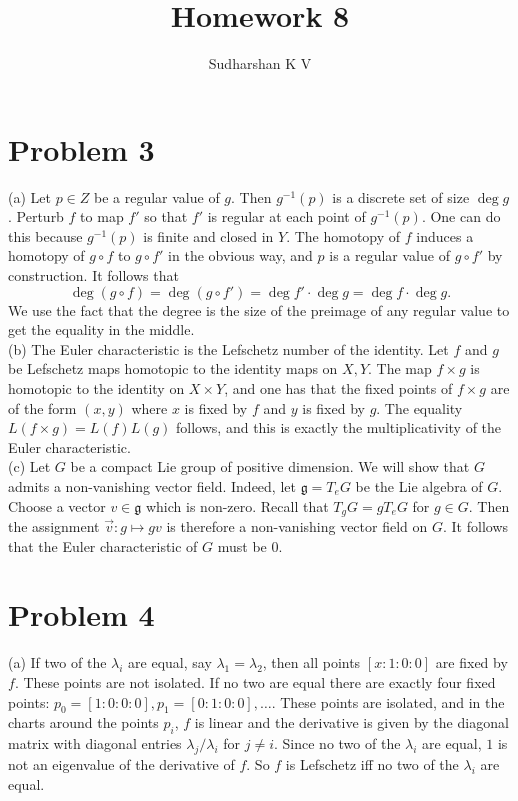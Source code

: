 \documentclass{amsart}
\title{Homework 8}
\author{Sudharshan K V}
\numberwithin{equation}{section}
\theoremstyle{plain}
\theoremstyle{definition}
\theoremstyle{remark}
\newcommand{\g}{\mathfrak{g}}
\renewcommand{\_}[2]{\underbrace{#1}_{#2}}
\renewcommand{\^}[2]{\overbrace{#1}_{#2}}
\begin{document}
\maketitle

\section*{Problem 3}

(a) Let $p\in Z$ be a regular value of $g$. Then $g^{-1}(p)$ is a discrete set of size $\deg g$. Perturb $f$ to map $f'$ so that $f'$ is regular at each point of $g^{-1}(p)$. One can do this because $g^{-1}(p)$ is finite and closed in $Y$. The homotopy of $f$ induces a homotopy of $g\circ f$ to $g \circ f'$ in the obvious way, and $p$ is a regular value of $g \circ f'$ by construction. It follows that \[\deg (g\circ f) = \deg (g\circ f') = \deg f' \cdot \deg g = \deg f \cdot \deg g.\] We use the fact that the degree is the size of the preimage of any regular value to get the equality in the middle.\\

(b) The Euler characteristic is the Lefschetz number of the identity. Let $f$ and $g$ be Lefschetz maps homotopic to the identity maps on $X,Y$. The map $f\times g$ is homotopic to the identity on $X\times Y$, and one has that the fixed points of $f\times g$ are of the form $(x,y)$ where $x$ is fixed by $f$ and $y$ is fixed by $g$. The equality $L(f\times g) = L(f)L(g)$ follows, and this is exactly the multiplicativity of the Euler characteristic.\\

(c) Let $G$ be a compact Lie group of positive dimension. We will show that $G$ admits a non-vanishing vector field. Indeed, let $\g = T_eG$ be the Lie algebra of $G$. Choose a vector $v \in \g$ which is non-zero. Recall that $T_gG = gT_eG$ for $g\in G$. Then the assignment $\vec v: g \mapsto gv$ is therefore a non-vanishing vector field on $G$. It follows that the Euler characteristic of $G$ must be $0$.

\section*{Problem 4}

(a) If two of the $\lambda_i$ are equal, say $\lambda_1 = \lambda_2$, then all points $[x:1:0:0]$ are fixed by $f$. These points are not isolated. If no two are equal there are exactly four fixed points: $p_0 = [1:0:0:0], p_1 = [0:1:0:0], \dots$. These points are isolated, and in the charts around the points $p_i$, $f$ is linear and the derivative is given by the diagonal matrix with diagonal entries $\lambda_j/\lambda_i$ for $j\neq i$. Since no two of the $\lambda_i$ are equal, $1$ is not an eigenvalue of the derivative of $f$. So $f$ is Lefschetz iff no two of the $\lambda_i$ are equal.\\
\end{document}
